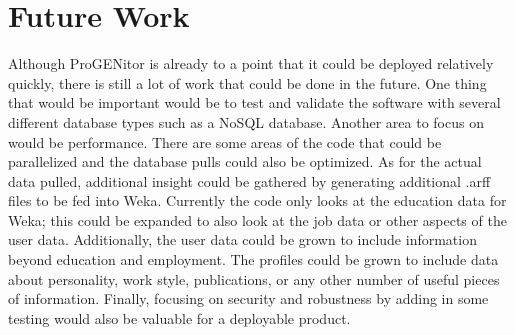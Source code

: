 \section{Future Work}
\label{sect:future-work}
Although ProGENitor is already to a point that it could be deployed relatively
quickly, there is still a lot of work that could be done in the future.  One
thing that would be important would be to test and validate the software with
several different database types such as a NoSQL database.  Another area to
focus on would be performance.  There are some areas of the code that could be
parallelized and the database pulls could also be optimized.  As for the actual
data pulled, additional insight could be gathered by generating additional .arff
files to be fed into Weka.  Currently the code only looks at the education data
for Weka; this could be expanded to also look at the job data or other aspects
of the user data.  Additionally, the user data could be grown to include
information beyond education and employment.  The profiles could be grown to
include data about personality, work style, publications, or any other number of
useful pieces of information.  Finally, focusing on security and robustness by
adding in some testing would also be valuable for a deployable product.